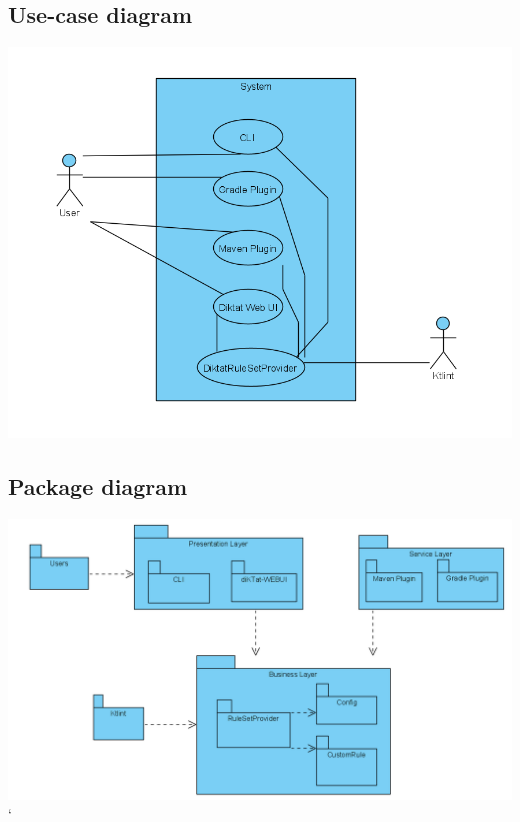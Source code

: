 \subsection{Use-case diagram}
\includegraphics[scale=0.8]{pictures/useCase.png}
\subsection{Package diagram}
\includegraphics[scale=0.65]{pictures/package.png}
\lstMakeShortInline[basicstyle=\ttfamily\bfseries]`
